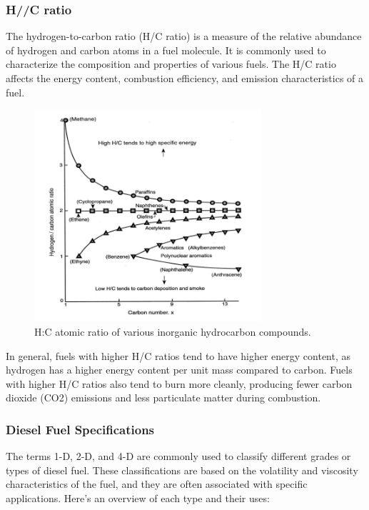 \documentclass{article}
\begin{document}
\subsubsection*{H//C ratio}
The hydrogen-to-carbon ratio (H/C ratio) is a measure of the relative abundance of hydrogen and carbon atoms in a fuel molecule. It is commonly used to characterize the composition and properties of various fuels. The H/C ratio affects the energy content, combustion efficiency, and emission characteristics of a fuel.

\begin{figure}
  \centering
  \includegraphics[width=0.75\textwidth]{img/hc_ratio.png}
  \caption{H:C atomic ratio of various inorganic hydrocarbon compounds.}
  \label{fig:Different H/C ratio }
\end{figure}

In general, fuels with higher H/C ratios tend to have higher energy content, as hydrogen has a higher energy content per unit mass compared to carbon. Fuels with higher H/C ratios also tend to burn more cleanly, producing fewer carbon dioxide (CO2) emissions and less particulate matter during combustion.


\subsubsection*{Diesel Fuel Specifications}
The terms 1-D, 2-D, and 4-D are commonly used to classify different grades or types of diesel fuel. These classifications are based on the volatility and viscosity characteristics of the fuel, and they are often associated with specific applications. Here's an overview of each type and their uses:
\end{document}
